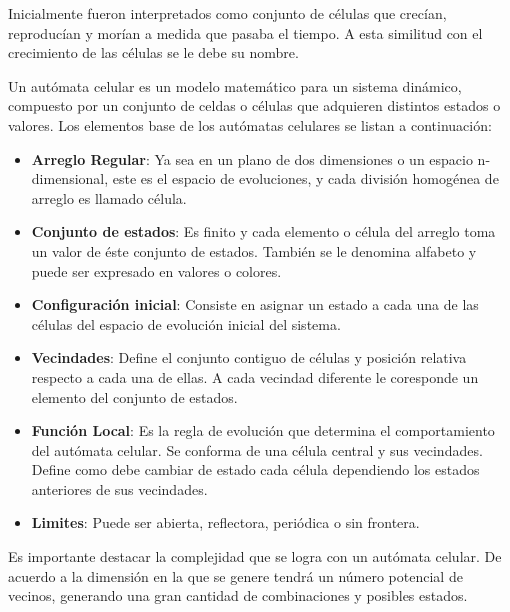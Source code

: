       Inicialmente fueron interpretados como conjunto de células que crecían, reproducían y morían a medida que pasaba el tiempo. A esta similitud con el crecimiento de las células se le debe su nombre.

      Un autómata celular es un modelo matemático para un sistema dinámico, compuesto por un conjunto de celdas o células que adquieren distintos estados o valores. Los elementos base de los autómatas celulares se listan a continuación:
      \begin{itemize}
        \item{\textbf{Arreglo Regular}: Ya sea en un plano de dos dimensiones o un espacio n-dimensional, este es el espacio de evoluciones, y cada división homogénea de arreglo es llamado célula.}
        \item{\textbf{Conjunto de estados}: Es finito y cada elemento o célula del arreglo toma un valor de éste conjunto de estados. También se le denomina alfabeto y puede ser expresado en valores o colores.}
        \item{\textbf{Configuración inicial}: Consiste en asignar un estado a cada una de las células del espacio de evolución inicial del sistema.}
        \item{\textbf{Vecindades}: Define el conjunto contiguo de células y posición relativa respecto a cada una de ellas. A cada vecindad diferente le coresponde un elemento del conjunto de estados.}
        \item{\textbf{Función Local}: Es la regla de evolución que determina el comportamiento del autómata celular. Se conforma de una célula central y sus vecindades. Define como debe cambiar de estado cada célula dependiendo los estados anteriores de sus vecindades.}
        \item{\textbf{Limites}: Puede ser abierta, reflectora, periódica o sin frontera.}
      \end{itemize}
    Es importante destacar la complejidad que se logra con un autómata celular. De acuerdo a la dimensión en la que se genere tendrá un número potencial de vecinos, generando una gran cantidad de combinaciones y posibles estados.

